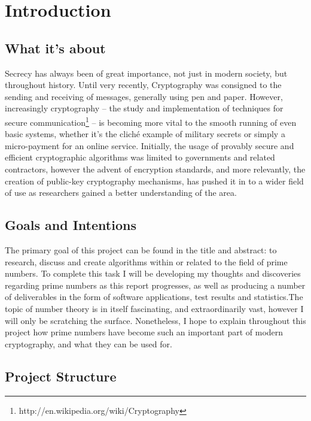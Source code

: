 \chapter{Introduction}
\label{Chapter1}

\section{What it's about}

Secrecy has always been of great importance, not just in modern society, but throughout history. Until very recently, Cryptography was consigned to the sending and receiving of messages, generally using pen and paper. However, increasingly cryptography -- the study and implementation of techniques for secure communication\footnote{http://en.wikipedia.org/wiki/Cryptography} -- is becoming more vital to the smooth running of even basic systems, whether it's the clich\'{e} example of military secrets or simply a micro-payment for an online service. Initially, the usage of provably secure and efficient cryptographic algorithms was limited to governments and related contractors, however the advent of encryption standards, and more relevantly, the creation of public-key cryptography mechanisms, has pushed it in to a wider field of use as researchers gained a better understanding of the area. 

\section{Goals and Intentions}

The primary goal of this project can be found in the title and abstract: to research, discuss and create algorithms within or related to the field of prime numbers. To complete this task I will be developing my thoughts and discoveries regarding prime numbers as this report progresses, as well as producing a number of deliverables in the form of software applications, test results and statistics.The topic of number theory is in itself fascinating, and extraordinarily vast, however I will only be scratching the surface. Nonetheless, I hope to explain throughout this project how prime numbers have become such an important part of modern cryptography, and what they can be used for.

\section{Project Structure}

